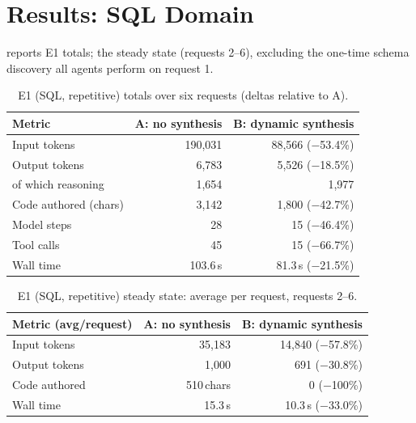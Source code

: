 \section{Results: SQL Domain}
 reports E1 totals;  the steady state
(requests 2--6), excluding the one-time schema discovery all agents perform on
request 1.

\begin{table}[htbp]
    \centering
    \caption{E1 (SQL, repetitive) totals over six requests (deltas relative to A).}
    \label{tab:e1_totals}
    \small
    \begin{tabular}{@{}lrr@{}}
        \toprule
        \textbf{Metric} & \textbf{A: no synthesis} & \textbf{B: dynamic synthesis} \\
        \midrule
        Input tokens        & 190{,}031 & 88{,}566 ($-$53.4\%) \\
        Output tokens       & 6{,}783   & 5{,}526 ($-$18.5\%) \\
        \quad of which reasoning & 1{,}654 & 1{,}977 \\
        Code authored (chars)& 3{,}142  & 1{,}800 ($-$42.7\%) \\
        Model steps         & 28        & 15 ($-$46.4\%) \\
        Tool calls          & 45        & 15 ($-$66.7\%) \\
        Wall time           & 103.6\,s  & 81.3\,s ($-$21.5\%) \\
        \bottomrule
    \end{tabular}
\end{table}

\begin{table}[htbp]
    \centering
    \caption{E1 (SQL, repetitive) steady state: average per request, requests 2--6.}
    \label{tab:e1_steady}
    \small
    \begin{tabular}{@{}lrr@{}}
        \toprule
        \textbf{Metric (avg/request)} & \textbf{A: no synthesis} & \textbf{B: dynamic synthesis} \\
        \midrule
        Input tokens  & 35{,}183 & 14{,}840 ($-$57.8\%) \\
        Output tokens & 1{,}000  & 691 ($-$30.8\%) \\
        Code authored & 510\,chars & 0 ($-$100\%) \\
        Wall time     & 15.3\,s  & 10.3\,s ($-$33.0\%) \\
        \bottomrule
    \end{tabular}
\end{table}

